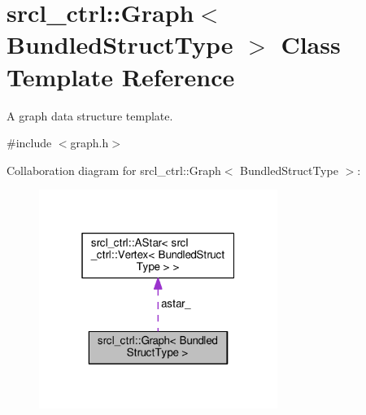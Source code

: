\hypertarget{classsrcl__ctrl_1_1Graph}{\section{srcl\-\_\-ctrl\-:\-:Graph$<$ Bundled\-Struct\-Type $>$ Class Template Reference}
\label{classsrcl__ctrl_1_1Graph}
}


A graph data structure template.  




{\ttfamily \#include $<$graph.\-h$>$}



Collaboration diagram for srcl\-\_\-ctrl\-:\-:Graph$<$ Bundled\-Struct\-Type $>$\-:\nopagebreak
\begin{figure}[H]
\begin{center}
\leavevmode
\includegraphics[width=220pt]{classsrcl__ctrl_1_1Graph__coll__graph}
\end{center}
\end{figure}
